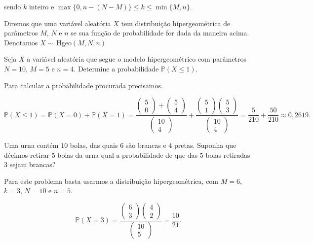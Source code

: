 \documentclass[10pt,a4paper]{article}
\begin{document}
sendo $ k $ inteiro e $ \max\{0,n-(N-M)\}\leq k \leq \min\{M,n\} $.

\begin{df}
	Diremos que uma variável aleatória $ X $ tem distribuição hipergeométrica de parâmetros $ M $, $ N $ e $ n $ se sua função de probabilidade for dada da maneira acima. Denotamos $ X \sim \ \text{Hgeo}(M,N,n) $
\end{df}

\begin{eg}
	Seja $ X $ a variável aleatória que segue o modelo hipergeométrico com parâmetros $ N=10 $, $ M=5 $ e $ n=4 $. Determine a probabilidade $ \mathbb{P}(X\leq 1) $.
\end{eg}

\begin{sol}
	Para calcular a probabilidade procurada precisamos.

\[\mathbb{P}(X\leq 1)=\mathbb{P}(X=0)+\mathbb{P}(X=1)=\frac{\left(\begin{array}{c}5\\0\end{array}\right) + \left(\begin{array}{c}5\\4\end{array}\right)}{\left(\begin{array}{c}10\\4\end{array}\right)} + \frac{\left(\begin{array}{c}5\\1\end{array}\right)\left(\begin{array}{c}5\\3\end{array}\right)}{\left(\begin{array}{c}10\\4\end{array}\right)}=\frac{5}{210}+\frac{50}{210}\approx 0,2619.\]
\end{sol}

\begin{eg}
	Uma urna contém $ 10 $ bolas, das quais $ 6 $ são brancas e $ 4 $ pretas. Suponha que décimos retirar $ 5 $ bolas da urna qual a probabilidade de que das $ 5 $ bolas retiradas $ 3 $ sejam brancas?
\end{eg}

\begin{sol}
	Para este problema basta usarmos a distribuição hipergeométrica, com $ M=6 $, $ k=3 $, $ N=10 $ e $ n=5 $.

\[\mathbb{P}\left(X=3\right)=\frac{\left(\begin{array}{c}6\\3\end{array}\right)\left(\begin{array}{c}4\\2\end{array}\right)}{\left(\begin{array}{c}10\\5\end{array}\right)}=\frac{10}{21}.\]
\end{sol}
\end{document}
